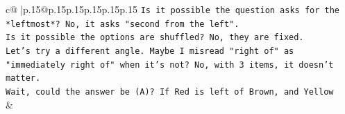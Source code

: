 \documentclass{article}
\begin{document}
{\begin{supertabular}{c@{$\;$}|p{.15\linewidth}@{}p{.15\linewidth}p{.15\linewidth}p{.15\linewidth}p{.15\linewidth}p{.15\linewidth}}
{{{\texttt{Is it possible the question asks for the *leftmost*? No, it asks "second from the left".} \\
\texttt{Is it possible the options are shuffled? No, they are fixed.} \\
\texttt{Let's try a different angle. Maybe I misread "right of" as "immediately right of" when it's not? No, with 3 items, it doesn't matter.} \\
\texttt{Wait, could the answer be (A)? If Red is left of Brown, and Yellow} \\
            }
        }
    }
    & \\ \\

\end{supertabular}
}
\end{document}
